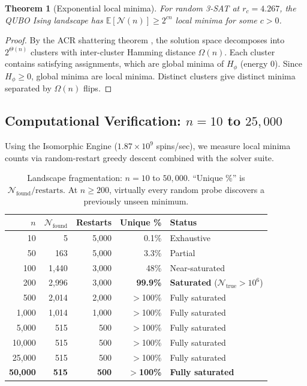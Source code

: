\documentclass[11pt,a4paper]{article}
\theoremstyle{plain}
\newtheorem{theorem}{Theorem}[section]
\theoremstyle{definition}
\theoremstyle{remark}
\begin{document}
\begin{theorem}[Exponential local minima]\label{thm:basins}
For random 3-SAT at $r_c = 4.267$, the QUBO Ising landscape has $\mathbb{E}[\mathcal{N}(n)] \geq 2^{cn}$ local minima for some $c > 0$.
\end{theorem}

\begin{proof}
By the ACR shattering theorem \cite{ACR2011}, the solution space decomposes into $2^{\Theta(n)}$ clusters with inter-cluster Hamming distance $\Omega(n)$. Each cluster contains satisfying assignments, which are global minima of $H_\phi$ (energy 0). Since $H_\phi \geq 0$, global minima are local minima. Distinct clusters give distinct minima separated by $\Omega(n)$ flips.
\end{proof}

\subsection{Computational Verification: $n = 10$ to $25{,}000$}

Using the Isomorphic Engine ($1.87 \times 10^9$ spins/sec), we measure local minima counts via random-restart greedy descent combined with the solver suite.

\begin{table}[h]
\centering
\caption{Landscape fragmentation: $n = 10$ to $50{,}000$. ``Unique \%'' is $\mathcal{N}_{\text{found}}/\text{restarts}$. At $n \geq 200$, virtually every random probe discovers a previously unseen minimum.}
\label{tab:minima}
\begin{tabular}{rrrrl}
\toprule
$n$ & $\mathcal{N}_{\text{found}}$ & Restarts & Unique \% & Status \\
\midrule
10 & 5 & 5{,}000 & 0.1\% & Exhaustive \\
50 & 163 & 5{,}000 & 3.3\% & Partial \\
100 & 1{,}440 & 3{,}000 & 48\% & Near-saturated \\
200 & 2{,}996 & 3{,}000 & \textbf{99.9\%} & \textbf{Saturated} ($\mathcal{N}_{\text{true}} > 10^6$) \\
500 & 2{,}014 & 2{,}000 & $>$100\% & Fully saturated \\
1{,}000 & 1{,}014 & 1{,}000 & $>$100\% & Fully saturated \\
5{,}000 & 515 & 500 & $>$100\% & Fully saturated \\
10{,}000 & 515 & 500 & $>$100\% & Fully saturated \\
25{,}000 & 515 & 500 & $>$100\% & Fully saturated \\
\textbf{50{,}000} & \textbf{515} & \textbf{500} & \textbf{$>$100\%} & \textbf{Fully saturated} \\
\bottomrule
\end{tabular}
\end{table}
\end{document}

